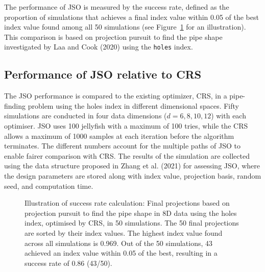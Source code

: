 \documentclass[
  12pt,
]{interact}
\theoremstyle{plain}
\begin{document}
The performance of JSO is measured by the success rate, defined as the
proportion of simulations that achieves a final index value within 0.05
of the best index value found among all 50 simulations (see
Figure~\ref{fig-success-rate} for an illustration). This comparison is
based on projection pursuit to find the pipe shape investigated by Laa
and Cook (2020) using the \texttt{holes} index.

\subsection{Performance of JSO relative to CRS}\label{sec-app-1}

The JSO performance is compared to the existing optimizer, CRS, in a
pipe-finding problem using the holes index in different dimensional
spaces. Fifty simulations are conducted in four data dimensions
(\(d = 6, 8, 10, 12\)) with each optimiser. JSO uses 100 jellyfish with
a maximum of 100 tries, while the CRS allows a maximum of 1000 samples
at each iteration before the algorithm terminates. The different numbers
account for the multiple paths of JSO to enable fairer comparison with
CRS. The results of the simulation are collected using the data
structure proposed in Zhang et al. (2021) for assessing JSO, where the
design parameters are stored along with index value, projection basis,
random seed, and computation time.

\begin{figure}


\caption{\label{fig-success-rate}Illustration of success rate
calculation: Final projections based on projection pursuit to find the
pipe shape in 8D data using the holes index, optimised by CRS, in 50
simulations. The 50 final projections are sorted by their index values.
The highest index value found across all simulations is 0.969. Out of
the 50 simulations, 43 achieved an index value within 0.05 of the best,
resulting in a success rate of 0.86 (43/50).}

\end{figure}%
\end{document}
